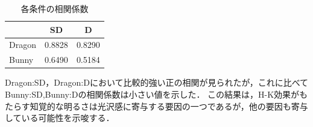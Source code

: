     \begin{table}[h]
        \centering
        \caption{各条件の相関係数}
        \begin{tabular}{|l||c|c|} \hline
                        & SD       & D        \\ \hline \hline
            Dragon      & 0.8828   & 0.8290   \\ \hline
            Bunny       & 0.6490   & 0.5184   \\ \hline
        \end{tabular}
    \end{table}

    Dragon:SD，Dragon:Dにおいて比較的強い正の相関が見られたが，これに比べてBunny:SD,Bunny:Dの相関係数は小さい値を示した．
    この結果は，H-K効果がもたらす知覚的な明るさは光沢感に寄与する要因の一つであるが，他の要因も寄与している可能性を示唆する．